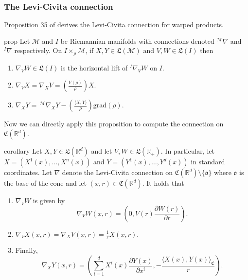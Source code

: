 \documentclass{article}
\newcommand{\man}{\mathcal{M}}
\begin{document}
\subsubsection{The Levi-Civita connection}
Proposition 35 of \citet{o1983semi} derives the Levi-Civita connection for warped products. 

\begin{restatable}{prop}{}
    Let $\man$ and $I$ be Riemannian manifolds with connections denoted $^{\man}\nabla$ and $^I\nabla$ respectively. On $I \times_\rho \man$, if $X, Y \in \mathfrak{L}(\man)$ and $V, W \in \mathfrak{L}(I)$ then
    \begin{enumerate}
        \item $\nabla_VW \in \mathfrak{L}(I)$ is the horizontal lift of $^{I}\nabla_VW$ on $I$.
        \item $\nabla_VX = \nabla_XV = \left(\frac{V(\rho)}{\rho}\right)X$.
        \item $\nabla_XY = \,^\man\nabla_XY - \left(\frac{\langle X, Y\rangle}{\rho}\right)\text{grad}(\rho)$.
    \end{enumerate}
\end{restatable}
\noindent Now we can directly apply this proposition to compute the connection on $\mathfrak{C}(\mathbb{R}^d).$ 

\begin{restatable}{corollary}{} \label{corollary: connection on cone}
    Let $X, Y \in \mathfrak{L}(\mathbb{R}^d)$ and let $V, W \in \mathfrak{L}(\mathbb{R}_+)$. In particular, let $X = (X^1(x), \dots, X^n(x))$ and $Y= (Y^1(x), \dots, Y^d(x))$ in standard coordinates. Let $\nabla$ denote the Levi-Civita connection on $\mathfrak{C}(\mathbb{R}^d) \setminus \{\mathfrak{o}\}$ where $\mathfrak{o}$ is the base of the cone and let $(x,r) \in \mathfrak{C}(\mathbb{R}^d)$. It holds that 
    \begin{enumerate}
        \item $\nabla_VW$ is given by 
        \[\nabla_VW(x,r) = \left(0, V(r)\frac{\partial W(r)}{\partial r}\right).\]
        \item $\nabla_VX(x,r) = \nabla_XV(x,r) = \frac{1}{r}X(x,r)$.
        \item Finally,
        \[\nabla_XY(x,r) = \left(\sum_{i = 1}^dX^i(x) \frac{\partial Y(x)}{\partial x^i},  - \frac{\langle X(x), Y(x) \rangle_{\mathfrak{C}}}{r}\right). \]
    \end{enumerate}
\end{restatable}
\end{document}
